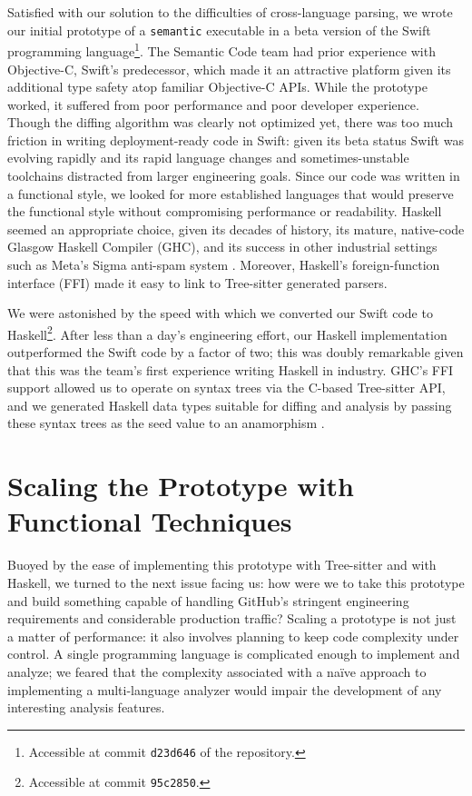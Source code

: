 \documentclass[acmsmall,fleqn,12pt]{acmart}
\begin{document}
Satisfied with our solution to the difficulties of cross-language parsing,
we wrote our initial prototype of a \texttt{semantic} executable in a beta
version of the Swift programming language\footnote{Accessible at commit
  \texttt{d23d646} of the \semantic{} repository.}. The Semantic Code team
had prior experience with Objective-C, Swift’s predecessor, which made it an
attractive platform given its additional type safety atop familiar
Objective-C APIs. While the prototype worked, it suffered from poor
performance and poor developer experience. Though the diffing algorithm was
clearly not optimized yet, there was too much friction in writing
deployment-ready code in Swift: given its beta status Swift was evolving
rapidly and its rapid language changes and sometimes-unstable toolchains
distracted from larger engineering goals. Since our code was written in a
functional style, we looked for more established languages that would
preserve the functional style without compromising performance or
readability. Haskell seemed an appropriate choice, given its decades of
history, its mature, native-code Glasgow Haskell Compiler (GHC), and its
success in other industrial settings such as Meta’s Sigma anti-spam system
\cite{marlow15spam,marlow14fork}. Moreover, Haskell’s foreign-function
interface (FFI) made it easy to link to Tree-sitter generated parsers.

We were astonished by the speed with which we converted our Swift code to
Haskell\footnote{Accessible at commit \texttt{95c2850}.}. After less
than a day’s engineering effort, our Haskell implementation outperformed the
Swift code by a factor of two; this was doubly remarkable given that this was
the team’s first experience writing Haskell in industry. GHC’s FFI support
allowed us to operate on syntax trees via the C-based Tree-sitter API, and we
generated Haskell data types suitable for diffing and analysis by passing these
syntax trees as the seed value to an anamorphism \cite{Meijer91Bananas}.

\section{Scaling the Prototype with Functional Techniques}
\label{sec:scaling}

Buoyed by the ease of implementing this prototype with Tree-sitter and with
Haskell, we turned to the next issue facing us: how were we to take this
prototype and build something capable of handling GitHub’s stringent engineering
requirements and considerable production traffic? Scaling a prototype is not
just a matter of performance: it also involves planning to keep code complexity
under control. A single programming language is complicated enough to implement
and analyze; we feared that the complexity associated with a naïve approach to
implementing a multi-language analyzer would impair the development of any
interesting analysis features.
\end{document}
